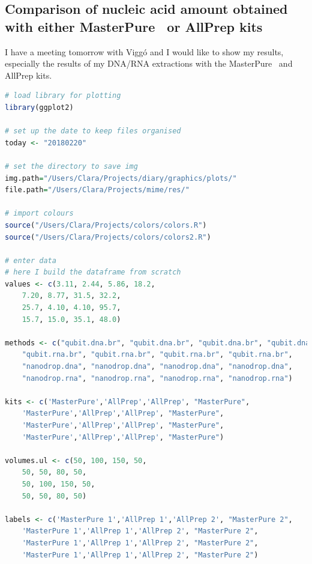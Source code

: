 \subsection{Comparison of nucleic acid amount obtained with either MasterPure\texttrademark~ or AllPrep kits}
\label{task:20180220_cj0}

I have a meeting tomorrow with Viggó and I would like to show my results, especially the results of my DNA/RNA extractions with the MasterPure\texttrademark~ and AllPrep kits. 

\begin{lstlisting}[language=r, caption=Comparison of nucleic acid amounts measured by fluorometric-based assay, label=lst:20180220_comparison_qnt]
# load library for plotting
library(ggplot2)

# set up the date to keep files organised
today <- "20180220"

# set the directory to save img
img.path="/Users/Clara/Projects/diary/graphics/plots/"
file.path="/Users/Clara/Projects/mime/res/"

# import colours
source("/Users/Clara/Projects/colors/colors.R")
source("/Users/Clara/Projects/colors/colors2.R")

# enter data
# here I build the dataframe from scratch
values <- c(3.11, 2.44, 5.86, 18.2, 
	7.20, 8.77, 31.5, 32.2,
	25.7, 4.10, 4.10, 95.7,
	15.7, 15.0, 35.1, 48.0)

methods <- c("qubit.dna.br", "qubit.dna.br", "qubit.dna.br", "qubit.dna.br",
	"qubit.rna.br", "qubit.rna.br", "qubit.rna.br", "qubit.rna.br",
	"nanodrop.dna", "nanodrop.dna", "nanodrop.dna", "nanodrop.dna",
	"nanodrop.rna", "nanodrop.rna", "nanodrop.rna", "nanodrop.rna")

kits <- c('MasterPure','AllPrep','AllPrep', "MasterPure",
 	'MasterPure','AllPrep','AllPrep', "MasterPure",
 	'MasterPure','AllPrep','AllPrep', "MasterPure",
 	'MasterPure','AllPrep','AllPrep', "MasterPure")

volumes.ul <- c(50, 100, 150, 50,
	50, 50, 80, 50,
	50, 100, 150, 50,
	50, 50, 80, 50)

labels <- c('MasterPure 1','AllPrep 1','AllPrep 2', "MasterPure 2",
 	'MasterPure 1','AllPrep 1','AllPrep 2', "MasterPure 2",
 	'MasterPure 1','AllPrep 1','AllPrep 2', "MasterPure 2",
 	'MasterPure 1','AllPrep 1','AllPrep 2', "MasterPure 2")


\end{lstlisting}
